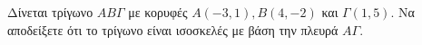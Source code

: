 Δίνεται τρίγωνο $ AB\varGamma $ με κορυφές $ A(-3,1),B(4,-2) $ και $ \varGamma(1,5) $. Να αποδείξετε ότι το τρίγωνο είναι ισοσκελές με βάση την πλευρά $ A\varGamma $.
